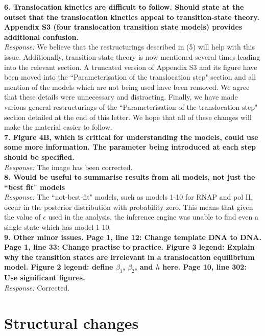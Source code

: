 \documentclass[12pt]{article}
\begin{document}
\noindent \textbf{6. Translocation kinetics are difficult to follow. Should state at the outset that the translocation kinetics appeal to transition-state theory. Appendix S3 (four translocation transition state models) provides additional confusion. } \\
\textit{Response:} We believe that the  restructurings described in (5) will help with this issue. Additionally, transition-state theory is now mentioned several times leading into the relevant section. A truncated version of Appendix S3 and its figure have been moved into the ``Parameterisation of the translocation step" section and all mention of the models which are not being used have been removed. We agree that these details were unnecessary and distracting. Finally, we have made various general restructurings of the ``Parameterisation of the translocation step" section detailed at the end of this letter. We hope that all of these changes will make the material easier to follow.  \\


\newpage
\noindent \textbf{7. Figure 4B, which is critical for understanding the models, could use some more information. The parameter being introduced at each step should be specified.} \\
\textit{Response:} The image has been corrected.  \\


\noindent \textbf{8. Would be useful to summarise results from all models, not just the ``best fit" models} \\
\textit{Response:} The ``not-best-fit" models, such as models 1-10 for RNAP and pol II, occur in the posterior distribution with probability zero. This means that given the value of $\epsilon$ used in the analysis, the inference engine was unable to find even a single state which has model 1-10.  \\



\noindent \textbf{9. Other minor issues. Page 1, line 12: Change template DNA to DNA. Page 1, line 33: Change practise to practice. Figure 3 legend: Explain why the transition states are irrelevant in a translocation equilibrium model. Figure 2 legend: define $\beta_1$, $\beta_2$, and $h$ here. Page 10, line 302: Use significant figures.} \\
\textit{Response:} Corrected.  \\




\newpage
\section*{Structural changes}
\end{document}
